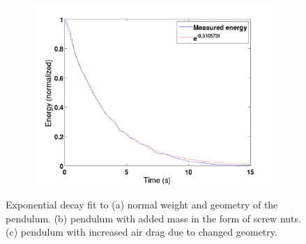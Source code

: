 \begin{figure}[htbp]
\begin{subfigure}{.45\textwidth}
	\caption{}
	\label{fig:resultExpHeavy}
\end{subfigure}\\
\begin{subfigure}{.45\textwidth}
	\centering
	\includegraphics[width=\textwidth]{img/resultExpDraggy}
	\caption{}
	\label{fig:resultExpDraggy}
\end{subfigure}
\caption{Exponential decay fit to (a) normal weight and geometry of the  pendulum. (b) pendulum with added mass in the form of screw nuts. (c) pendulum with increased air drag due to changed geometry.}
\label{fig:resultExp}
\end{figure}


